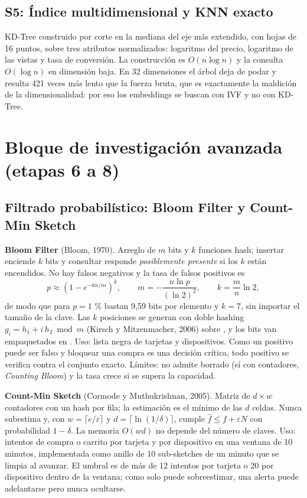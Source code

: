 \documentclass[11pt,letterpaper]{article}
\newcommand{\code}[1]{\texttt{\detokenize{#1}}}
\begin{document}
\subsection{S5: \'Indice multidimensional y KNN exacto}
KD-Tree construido por corte en la mediana del eje m\'as extendido, con hojas de 16 puntos, sobre tres atributos normalizados: logaritmo del precio, logaritmo de las vistas y tasa de conversi\'on. La construcci\'on es $O(n\log n)$ y la consulta $O(\log n)$ en dimensi\'on baja. En 32 dimensiones el \'arbol deja de podar y resulta 421 veces m\'as lento que la fuerza bruta, que es exactamente la maldici\'on de la dimensionalidad: por eso los embeddings se buscan con IVF y no con KD-Tree.

\section{Bloque de investigaci\'on avanzada (etapas 6 a 8)}

\subsection{Filtrado probabil\'istico: Bloom Filter y Count-Min Sketch}
\textbf{Bloom Filter} (Bloom, 1970). Arreglo de $m$ bits y $k$ funciones hash; insertar enciende $k$ bits y consultar responde \emph{posiblemente presente} si los $k$ est\'an encendidos. No hay falsos negativos y la tasa de falsos positivos es
\begin{equation}
p \approx \left(1-e^{-kn/m}\right)^{k}, \qquad m = -\frac{n\ln p}{(\ln 2)^2}, \qquad k = \frac{m}{n}\ln 2,
\end{equation}
de modo que para $p=1$ \% bastan 9,59 bits por elemento y $k=7$, sin importar el tama\~no de la clave. Las $k$ posiciones se generan con doble hashing $g_i = h_1 + i\,h_2 \bmod m$ (Kirsch y Mitzenmacher, 2006) sobre \code{splitmix64}, y los bits van empaquetados en \code{uint8}. Uso: lista negra de tarjetas y dispositivos. Como un positivo puede ser falso y bloquear una compra es una decisi\'on cr\'itica, todo positivo se verifica contra el conjunto exacto. L\'imites: no admite borrado (s\'i con contadores, \emph{Counting Bloom}) y la tasa crece si se supera la capacidad.

\textbf{Count-Min Sketch} (Cormode y Muthukrishnan, 2005). Matriz de $d\times w$ contadores con un hash por fila; la estimaci\'on es el m\'inimo de las $d$ celdas. Nunca subestima y, con $w=\lceil e/\varepsilon\rceil$ y $d=\lceil\ln(1/\delta)\rceil$, cumple $\hat{f} \le f + \varepsilon N$ con probabilidad $1-\delta$. La memoria $O(wd)$ no depende del n\'umero de claves. Uso: intentos de compra o carrito por tarjeta y por dispositivo en una ventana de 10 minutos, implementada como anillo de 10 sub-sketches de un minuto que se limpia al avanzar. El umbral es de m\'as de 12 intentos por tarjeta o 20 por dispositivo dentro de la ventana; como solo puede sobreestimar, una alerta puede adelantarse pero nunca ocultarse.
\end{document}
